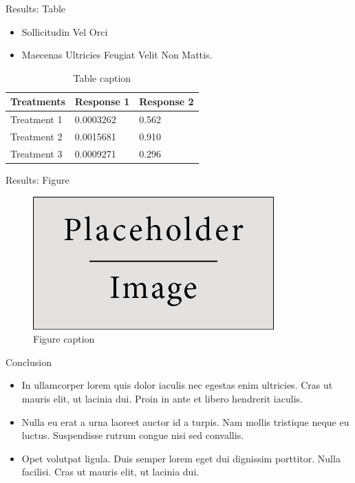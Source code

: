 \documentclass[final,hyperref={pdfpagelabels=false}]{beamer}
\begin{document}
\begin{frame}[t]
\begin{columns}[t]
\begin{column}{.465\textwidth}
\begin{ctblock}{Results: Table}
\begin{itemize}
\item Sollicitudin Vel Orci
\item Maecenas Ultricies Feugiat Velit Non Mattis.
\end{itemize}

\begin{table}
\begin{tabular}{l l l}
\toprule
\textbf{Treatments} & \textbf{Response 1} & \textbf{Response 2}\\
\midrule
Treatment 1 & 0.0003262 & 0.562 \\
Treatment 2 & 0.0015681 & 0.910 \\
Treatment 3 & 0.0009271 & 0.296 \\
\bottomrule
\end{tabular}
\caption{Table caption}
\end{table}

\end{ctblock}


\begin{ctblock}{Results: Figure}

\begin{figure}
\includegraphics[width=0.8\linewidth]{placeholder.jpg}
\caption{Figure caption}
\end{figure}

\end{ctblock}


\begin{mtblock}{Conclusion}

\begin{itemize}
\item In ullamcorper lorem quis dolor iaculis nec egestas enim ultricies. Cras ut mauris elit, ut lacinia dui. Proin in ante et libero hendrerit iaculis.
\item Nulla eu erat a urna laoreet auctor id a turpis. Nam mollis tristique neque eu luctus. Suspendisse rutrum congue nisi sed convallis.
\item Opet volutpat ligula. Duis semper lorem eget dui dignissim porttitor. Nulla facilisi. Cras ut mauris elit, ut lacinia dui.
\end{itemize}


\end{mtblock}
\end{column}
\end{columns}
\end{frame}
\end{document}

